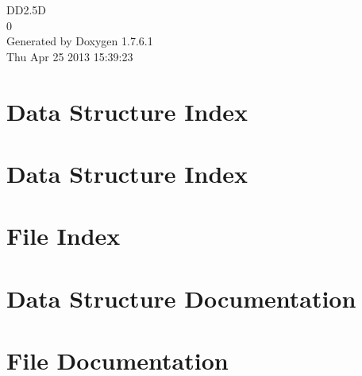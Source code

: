 \documentclass[a4paper]{book}
\begin{document}
\hypersetup{pageanchor=false,citecolor=blue}
\begin{titlepage}
\vspace*{7cm}
\begin{center}
{\Large \-D\-D2.5\-D \\[1ex]\large 0 }\\
\vspace*{1cm}
{\large \-Generated by Doxygen 1.7.6.1}\\
\vspace*{0.5cm}
{\small Thu Apr 25 2013 15:39:23}\\
\end{center}
\end{titlepage}
\clearemptydoublepage
{}
\tableofcontents
\clearemptydoublepage
{}
\hypersetup{pageanchor=true,citecolor=blue}
\chapter{\-Data \-Structure \-Index}

\chapter{\-Data \-Structure \-Index}

\chapter{\-File \-Index}

\chapter{\-Data \-Structure \-Documentation}




\chapter{\-File \-Documentation}








\printindex
\end{document}
